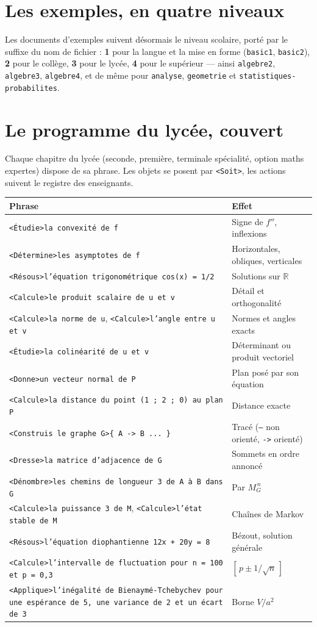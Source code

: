 \documentclass[11pt,a4paper]{article}
\newcommand{\bal}[1]{\texttt{#1}}
\begin{document}
\section{Les exemples, en quatre niveaux}

Les documents d'exemples suivent désormais le niveau scolaire, porté
par le suffixe du nom de fichier : \textbf{1} pour la langue et la mise
en forme (\bal{basic1}, \bal{basic2}), \textbf{2} pour le collège,
\textbf{3} pour le lycée, \textbf{4} pour le supérieur — ainsi
\bal{algebre2}, \bal{algebre3}, \bal{algebre4}, et de même pour
\bal{analyse}, \bal{geometrie} et \bal{statistiques-probabilites}.

\section{Le programme du lycée, couvert}

Chaque chapitre du lycée (seconde,
première, terminale spécialité, option maths expertes) dispose de sa
phrase. Les objets se posent par \bal{<Soit>}, les actions suivent le
registre des enseignants.

\begin{longtable}{@{}ll@{}}
\toprule
\textbf{Phrase} & \textbf{Effet} \\
\midrule
\bal{<Étudie>la convexité de f} & Signe de $f''$, inflexions \\
\bal{<Détermine>les asymptotes de f} & Horizontales, obliques, verticales \\
\bal{<Résous>l'équation trigonométrique cos(x) = 1/2} & Solutions sur $\mathbb{R}$ \\
\bal{<Calcule>le produit scalaire de u et v} & Détail et orthogonalité \\
\bal{<Calcule>la norme de u}, \bal{<Calcule>l'angle entre u et v} & Normes et angles exacts \\
\bal{<Étudie>la colinéarité de u et v} & Déterminant ou produit vectoriel \\
\bal{<Donne>un vecteur normal de P} & Plan posé par son équation \\
\bal{<Calcule>la distance du point (1 ; 2 ; 0) au plan P} & Distance exacte \\
\bal{<Construis le graphe G>\{ A -> B ... \}} & Tracé (\bal{--} non orienté, \bal{->} orienté) \\
\bal{<Dresse>la matrice d'adjacence de G} & Sommets en ordre annoncé \\
\bal{<Dénombre>les chemins de longueur 3 de A à B dans G} & Par $M_G^{\,n}$ \\
\bal{<Calcule>la puissance 3 de M}, \bal{<Calcule>l'état stable de M} & Chaînes de Markov \\
\bal{<Résous>l'équation diophantienne 12x + 20y = 8} & Bézout, solution générale \\
\bal{<Calcule>l'intervalle de fluctuation pour n = 100 et p = 0,3} & $[\,p \pm 1/\sqrt{n}\,]$ \\
\bal{<Applique>l'inégalité de Bienaymé-Tchebychev pour une espérance de 5, une variance de 2 et un écart de 3} & Borne $V/a^2$ \\
\bottomrule
\end{longtable}
\end{document}
